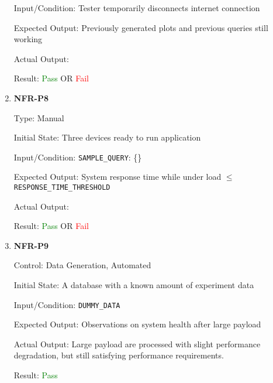 \documentclass[12pt, titlepage]{article}
\begin{document}
\begin{enumerate}
Input/Condition: Tester temporarily disconnects internet connection

Expected Output: Previously generated plots and previous queries still working

Actual Output:

Result: \textcolor{green}{Pass} OR \textcolor{red}{Fail}

\item{\textbf{NFR-P8}} \label{NFR:P8}

Type: Manual

Initial State: Three devices ready to run application

Input/Condition: \texttt{SAMPLE\_QUERY}: \{\}

Expected Output: System response time while under load $\leq$
\texttt{RESPONSE\_TIME\_THRESHOLD}

Actual Output:

Result: \textcolor{green}{Pass} OR \textcolor{red}{Fail}

\item{\textbf{NFR-P9}} \label{NFR:P9}

Control: Data Generation, Automated

Initial State: A database with a known amount of experiment data

Input/Condition: \texttt{DUMMY\_DATA}

Expected Output: Observations on system health after large payload

Actual Output: Large payload are processed with slight performance degradation,
but still satisfying performance requirements.

Result: \textcolor{green}{Pass}

\end{enumerate}
\end{document}
